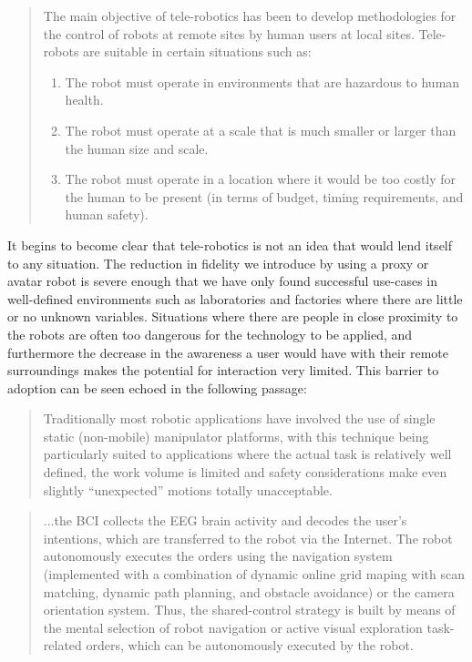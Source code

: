 \documentclass[final,a4paper,12pt]{report}
\begin{document}
\begin{quote}

The main objective of tele-robotics has been to develop methodologies for the control of robots at remote sites by human users at local sites. Tele-robots are suitable in certain situations such as:
\begin{enumerate}
\item The robot must operate in environments that are hazardous to human health.
\item The robot must operate at a scale that is much smaller or larger than the human size and scale.
\item The robot must operate in a location where it would be too costly for the human to be present (in terms of budget, timing requirements, and human safety).
\end{enumerate}
	\begin{flushright}
		\cite{726589}
	\end{flushright}
\end{quote}

It begins to become clear that tele-robotics is not an idea that would lend itself to any situation. The reduction in fidelity we introduce by using a proxy or avatar robot is severe enough that we have only found successful use-cases in well-defined environments such as laboratories and factories where there are little or no unknown variables. Situations where there are people in close proximity to the robots are often too dangerous for the technology to be applied, and furthermore the decrease in the awareness a user would have with their remote surroundings makes the potential for interaction very limited. This barrier to adoption can be seen echoed in the following passage:

\begin{quote}
	Traditionally most robotic applications have involved the use of single static (non-mobile) manipulator platforms, with this technique being particularly suited to applications where the actual task is relatively well defined, the work volume is limited and safety considerations make even slightly “unexpected” motions totally unacceptable.
	\begin{flushright}
		\cite{540147}
	\end{flushright}
\end{quote}



\begin{quotation}{
	...the BCI collects the EEG brain activity and decodes the user's intentions, which are transferred to the robot via the Internet. The robot autonomously executes the orders using the navigation system (implemented with a combination of dynamic online grid maping with scan matching, dynamic path planning, and obstacle avoidance) or the camera orientation system. Thus, the shared-control strategy is built by means  of the mental selection of robot navigation or active visual exploration task-related orders, which can be autonomously executed by the robot.}
	\begin{flushright}
		\cite{6104414}
	\end{flushright}
\end{quotation}
\end{document}

